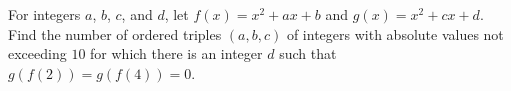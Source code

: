 For integers $a$, $b$, $c$, and $d$, let $f(x) = x^2 + ax + b$ and $g(x) = x^2 + cx + d$. Find the number of ordered triples $(a,b,c)$ of integers with absolute values not exceeding $10$ for which there is an integer $d$ such that $g(f(2)) = g(f(4)) = 0$.